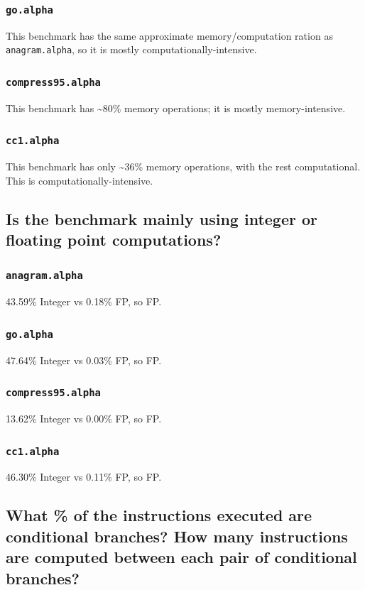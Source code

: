 \documentclass[11pt]{article}
\begin{document}
\subsubsection{\texttt{go.alpha}}
\label{sec:orgd7fd98a}
This benchmark has the same approximate memory/computation ration as \texttt{anagram.alpha}, so it is mostly computationally-intensive.
\subsubsection{\texttt{compress95.alpha}}
\label{sec:org034678b}
This benchmark has \textasciitilde{}80\% memory operations; it is mostly memory-intensive.
\subsubsection{\texttt{cc1.alpha}}
\label{sec:org6ebda75}
This benchmark has only \textasciitilde{}36\% memory operations, with the rest computational. This is computationally-intensive.

\subsection{Is the benchmark mainly using integer or floating point computations?}
\label{sec:org0057d89}
\subsubsection{\texttt{anagram.alpha}}
\label{sec:org0b265ba}
43.59\% Integer vs 0.18\% FP, so FP.
\subsubsection{\texttt{go.alpha}}
\label{sec:orgd8d8009}
47.64\% Integer vs 0.03\% FP, so FP.
\subsubsection{\texttt{compress95.alpha}}
\label{sec:org0bebbf9}
13.62\% Integer vs 0.00\% FP, so FP.
\subsubsection{\texttt{cc1.alpha}}
\label{sec:org554dbf7}
46.30\% Integer vs 0.11\% FP, so FP.

\subsection{What \% of the instructions executed are conditional branches? How many instructions are computed between each pair of conditional branches?}
\label{sec:org4e1189a}
\end{document}
